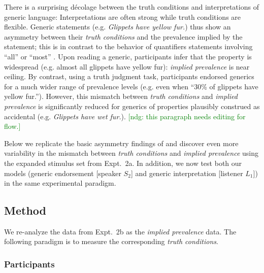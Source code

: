 \documentclass[12pt,letterpaper]{article}
\newcommand{\ndg}[1]{\textcolor{Green}{[ndg: #1]}}
\begin{document}
There is a surprising d\'{e}colage between the truth conditions and interpretations of generic language: Interpretations are often strong while truth conditions are flexible. 
Generic statements (e.g. \emph{Glippets have yellow fur.}) thus show an asymmetry between their \emph{truth conditions} and the prevalence implied by the statement; this is in contrast to the behavior of quantifiers statements involving ``all'' or ``most'' \cite{Cimpian2010}. 
Upon reading a generic, participants infer that the property is widespread (e.g. almost all glippets have yellow fur): \emph{implied prevalence} is near ceiling.
By contrast, using a truth judgment task, participants endorsed generics for a much wider range of prevalence levels (e.g. even when ``30\% of glippets have yellow fur.''). 
However, this mismatch between \emph{truth conditions} and \emph{implied prevalence} is significantly reduced for generics of properties plausibly construed as accidental (e.g. \emph{Glippets have wet fur.}).
\ndg{this paragraph needs editing for flow.}


Below we replicate the basic asymmetry findings of  and discover even more variability in the mismatch between \emph{truth conditions} and \emph{implied prevalence} using the expanded stimulus set from Expt.~2a.
In addition, we now test both our models (generic endorsement [speaker $S_2$] and generic interpretation [listener $L_1$]) in the same experimental paradigm. %


\subsection*{Method}

We re-analyze the data from Expt.~2b as the \emph{implied prevalence} data.
The following paradigm is to measure the corresponding \emph{truth conditions}.

\subsubsection*{Participants}
\end{document}

